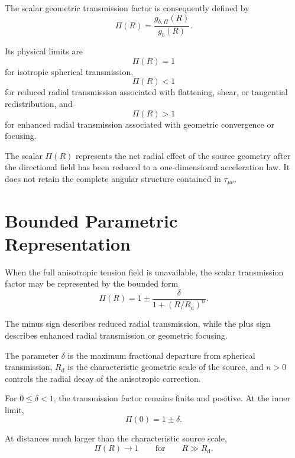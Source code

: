 The scalar geometric transmission factor is consequently defined by
\begin{equation}
    \Pi(R) = \frac{g_{b,\Pi}(R)}{g_b(R)}.
\end{equation}

Its physical limits are
\begin{equation}
    \Pi(R) = 1
\end{equation}
for isotropic spherical transmission,
\begin{equation}
    \Pi(R) < 1
\end{equation}
for reduced radial transmission associated with flattening, shear, or tangential redistribution, and
\begin{equation}
    \Pi(R) > 1
\end{equation}
for enhanced radial transmission associated with geometric convergence or focusing.

The scalar $\Pi(R)$ represents the net radial effect of the source geometry after the directional field has been reduced to a one-dimensional acceleration law. It does not retain the complete angular structure contained in $\tau_{\mu\nu}$.

\section{Bounded Parametric Representation}

When the full anisotropic tension field is unavailable, the scalar transmission factor may be represented by the bounded form
\begin{equation}
    \Pi(R) = 1 \pm \frac{\delta}{1+\left(R/R_{\mathrm{d}}\right)^n}.
\end{equation}

The minus sign describes reduced radial transmission, while the plus sign describes enhanced radial transmission or geometric focusing.

The parameter $\delta$ is the maximum fractional departure from spherical transmission, $R_{\mathrm{d}}$ is the characteristic geometric scale of the source, and $n>0$ controls the radial decay of the anisotropic correction.

For $0 \leq \delta < 1$, the transmission factor remains finite and positive. At the inner limit,
\begin{equation}
    \Pi(0) = 1 \pm \delta.
\end{equation}

At distances much larger than the characteristic source scale,
\begin{equation}
    \Pi(R) \rightarrow 1 \qquad \text{for} \qquad R \gg R_{\mathrm{d}}.
\end{equation}

